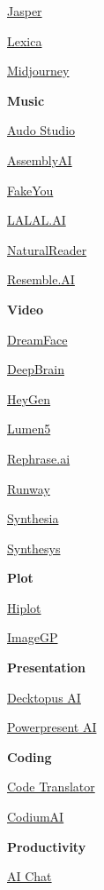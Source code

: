 \documentclass[
]{book}
\begin{document}
\href{https://www.jasper.ai/}{Jasper}

\href{https://lexica.art/}{Lexica}

\href{https://www.midjourney.com/home}{Midjourney}

\textbf{Music}

\href{https://audo.ai/}{Audo Studio}

\href{https://www.assemblyai.com/}{AssemblyAI}

\href{https://fakeyou.com/}{FakeYou}

\href{http://LALAL.AIhttps://www.lalal.ai/?gad_source=1\&gclid=Cj0KCQjwk6SwBhDPARIsAJ59Gwe8R6D_cisJF45mTx4pgQz01WhtUM2gqvDKZGUDPRqT4sIvC4rC2y4aAiX3EALw_wcB}{LALAL.AI}

\href{https://www.naturalreaders.com/}{NaturalReader}

\href{https://www.resemble.ai/}{Resemble.AI}

\textbf{Video}

\href{https://dreamfaceapp.com/}{DreamFace}

\href{https://www.deepbrain.io/}{DeepBrain}

\href{https://www.heygen.com/}{HeyGen}

\href{https://lumen5.com/}{Lumen5}

\href{https://www.rephrase.ai/}{Rephrase.ai}

\href{https://runwayml.com/}{Runway}

\href{https://www.synthesia.io/}{Synthesia}

\href{https://synthesys.io/}{Synthesys}

\textbf{Plot}

\href{https://hiplot.com.cn/home/index.en.html}{Hiplot}

\href{https://www.bic.ac.cn/ImageGP/}{ImageGP}

\textbf{Presentation}

\href{https://www.decktopus.com/?gad_source=1\&gclid=Cj0KCQjwk6SwBhDPARIsAJ59Gwc4xWCC-ZY81-gYiYl_NSnhkTYhHrSkNBFMRRkgU9aTMm5EjFl7ZigaAnutEALw_wcB}{Decktopus AI}

\href{https://powerpresent.ai/}{Powerpresent AI}

\textbf{Coding}

\href{https://ai-code-translator.vercel.app/}{Code Translator}

\href{https://codeium.com/}{CodiumAI}

\textbf{Productivity}

\href{https://deepai.org/chat}{AI Chat}
\end{document}
